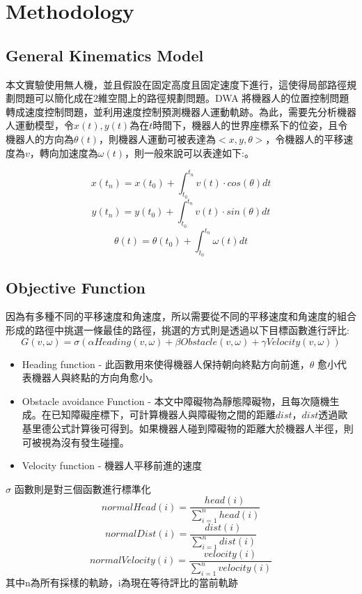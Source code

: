 \documentclass[crop=false]{standalone}
\begin{document}
	\section{Methodology}
	\subsection{General Kinematics Model}
	本文實驗使用無人機，並且假設在固定高度且固定速度下進行，這使得局部路徑規劃問題可以簡化成在2維空間上的路徑規劃問題。DWA 將機器人的位置控制問題轉成速度控制問題，並利用速度控制預測機器人運動軌跡。為此，需要先分析機器人運動模型\cite{fox}，令$x(t), y(t)$為在$t$時間下，機器人的世界座標系下的位姿，且令機器人的方向為$\theta(t)$，則機器人運動可被表達為$<x, y, \theta>$，令機器人的平移速度為$v$，轉向加速度為$\omega(t)$，則一般來說可以表達如下:。
	
	\begin{equation}
		x(t_n)=x(t_0)+ \int_{t_0}^{t_n}v(t) \cdot cos(\theta)dt
	\end{equation}
	\begin{equation}
		y(t_n)=y(t_0)+ \int_{t_0}^{t_n}v(t) \cdot sin(\theta)dt
	\end{equation}
	\begin{equation}
		\theta(t)=\theta(t_0)+\int_{t_0}^{t_n}\omega(t)dt
	\end{equation}
	
	
	\subsection{Objective Function}
	因為有多種不同的平移速度和角速度，所以需要從不同的平移速度和角速度的組合形成的路徑中挑選一條最佳的路徑，挑選的方式則是透過以下目標函數進行評比:
	\begin{equation}
		G(v, \omega)=\sigma(\alpha Heading(v, \omega) + \beta Obstacle(v, \omega) + \gamma Velocity(v, \omega))
	\end{equation}
	\begin{itemize}
		\item Heading function - 此函數用來使得機器人保持朝向終點方向前進，$\theta$ 愈小代表機器人與終點的方向角愈小。
		\item Obstacle avoidance Function - 本文中障礙物為靜態障礙物，且每次隨機生成。在已知障礙座標下，可計算機器人與障礙物之間的距離$dist$，$dist$透過歐基里德公式計算後可得到。如果機器人碰到障礙物的距離大於機器人半徑，則可被視為沒有發生碰撞。
		\item Velocity function - 機器人平移前進的速度
	\end{itemize}
	$\sigma$ 函數則是對三個函數進行標準化
	\begin{equation}
		normalHead(i)=\frac{head(i)}{\sum_{i=1}^{n}{head(i)}}
	\end{equation}
	\begin{equation}
		normalDist(i)=\frac{dist(i)}{\sum_{i=1}^{n}{dist(i)}}
	\end{equation}
	\begin{equation}
		normalVelocity(i)=\frac{velocity(i)}{\sum_{i=1}^{n}{velocity(i)}}
	\end{equation}
	其中n為所有採樣的軌跡，i為現在等待評比的當前軌跡
\end{document}
